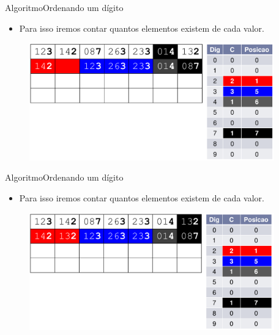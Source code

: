 \documentclass[aspectratio=169]{beamer}
\begin{document}
\begin{frame}{Algoritmo}{Ordenando um dígito}
\begin{itemize}
\item Para isso iremos contar quantos elementos existem de cada valor.
\end{itemize}
\begin{figure}[!h]
  \centering
  \includegraphics[width=300pt]{imgs/radix9.png}
  \label{radix9}
\end{figure}
\end{frame}


\begin{frame}{Algoritmo}{Ordenando um dígito}
\begin{itemize}
\item Para isso iremos contar quantos elementos existem de cada valor.
\end{itemize}
\begin{figure}[!h]
  \centering
  \includegraphics[width=300pt]{imgs/radix10.png}
  \label{radix10}
\end{figure}
\end{frame}
\end{document}
